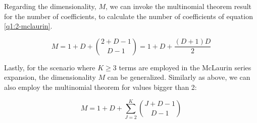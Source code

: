 \documentclass[11pt]{article}
\begin{document}
Regarding the dimensionality, \(M\), we can invoke the multinomial theorem result for the number of coefficients, to calculate the number of coefficients of equation \ref{q1:2-mclaurin}.

\[
M = 1 + D + \binom{2 + D - 1}{D - 1} = 1 + D + \frac{(D+1)D}{2}
\]

Lastly, for the scenario where $K \geq 3$ terms are employed in the McLaurin series expansion, the dimensionality $M$ can be generalized. Similarly as above, we can also employ the multinomial theorem for values bigger than 2:

\[
M = 1 + D + \sum_{J=2}^{K}{\binom{J + D - 1}{D - 1}}
\]
\end{document}
